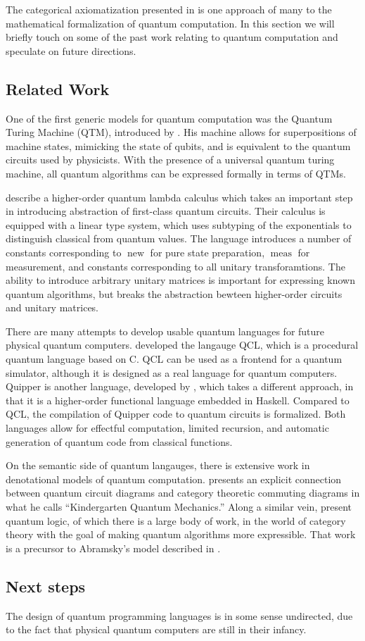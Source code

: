 The categorical axiomatization presented in  is one approach of many
to the mathematical formalization of quantum computation. In this section
we will briefly touch on some of the past work relating to quantum computation
and speculate on future directions.

\subsection{Related Work} 

One of the first generic models for quantum computation was the Quantum
Turing Machine (QTM), introduced by \cite{deutsch1985}. His machine allows for superpositions
of machine states, mimicking the state of qubits, and is equivalent to the
quantum circuits used by physicists. With the presence of a universal quantum turing
machine, all quantum algorithms can be expressed formally in terms of QTMs. 

\cite{selinger2006lambda,selinger2009quantum} describe a higher-order quantum lambda 
calculus which  takes an important step in introducing abstraction of first-class 
quantum circuits.
Their calculus is equipped with a linear type system, which uses subtyping of the
exponentials to distinguish classical from quantum values. The language introduces
a number of constants corresponding to $\operatorname{new}$ for pure state preparation,
$\operatorname{meas}$ for measurement, and constants corresponding to all unitary
transforamtions. The ability to introduce arbitrary unitary matrices is
important for expressing known quantum algorithms, but breaks the abstraction 
bewteen higher-order circuits and unitary matrices.

There are many attempts to develop usable quantum languages for future physical quantum
computers. \cite{omer2000quantum} developed the langauge QCL, which is a procedural
quantum language based on C. QCL can be used as a frontend for a quantum simulator,
although it is designed as a real language for quantum computers. Quipper is another
language, developed by \cite{green13quipper}, which takes a different approach, in that
it is a higher-order functional language embedded in Haskell. Compared to QCL,
the compilation of Quipper code to quantum circuits is formalized. 
Both languages allow for effectful computation, limited recursion, and automatic
generation of quantum code from classical functions.

On the semantic side of quantum langauges, there is extensive work in denotational 
models of quantum computation. \cite{coecke2005kindergarten} presents an
explicit connection between quantum circuit diagrams and category theoretic 
commuting diagrams in what he calls ``Kindergarten Quantum Mechanics.''
Along a similar vein, \cite{abramsky2006categorical} present quantum logic,
of which there is a large body of work, in the world of category theory with
the goal of making quantum algorithms more expressible. That work is a precursor
to Abramsky's model described in .

\subsection{Next steps}

The design of quantum programming languages is in some sense undirected,
due to the fact that physical quantum computers are still in their infancy.


